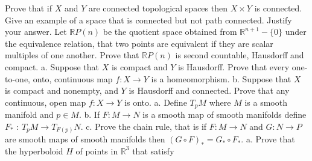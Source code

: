 \documentclass[10pt]{article}
\begin{document}
\newpage
   Prove that if $X$ and $Y$ are connected topological spaces then $X \times Y$ is connected.
\newpage
   Give an example of a space that is connected but not path connected. Justify your answer.
\newpage
   Let $\mathbb{R} P(n)$ be the quotient space obtained from $\mathbb{R}^{n+1}-\{0\}$ under the equivalence relation, that two points are equivalent if they are scalar multiples of one another. Prove that $\mathbb{R} P(n)$ is second countable, Hausdorff and compact.
\newpage
a. Suppose that $X$ is compact and $Y$ is Hausdorff. Prove that every one-to-one, onto, continuous map $f: X \rightarrow Y$ is a homeomorphism.
b. Suppose that $X$ is compact and nonempty, and $Y$ is Hausdorff and connected. Prove that any continuous, open map $f: X \rightarrow Y$ is onto.
\newpage
a. Define $T_{p} M$ where $M$ is a smooth manifold and $p \in M$.
b. If $F: M \rightarrow N$ is a smooth map of smooth manifolds define $F_{*}$ : $T_{p} M \rightarrow T_{F(p)} N$.
c. Prove the chain rule, that is if $F: M \rightarrow N$ and $G: N \rightarrow P$ are smooth maps of smooth manifolds then $(G \circ F)_{*}=G_{*} \circ F_{*}$.
\newpage
a. Prove that the hyperboloid $H$ of points in $\mathbb{R}^{3}$ that satisfy
\end{document}
